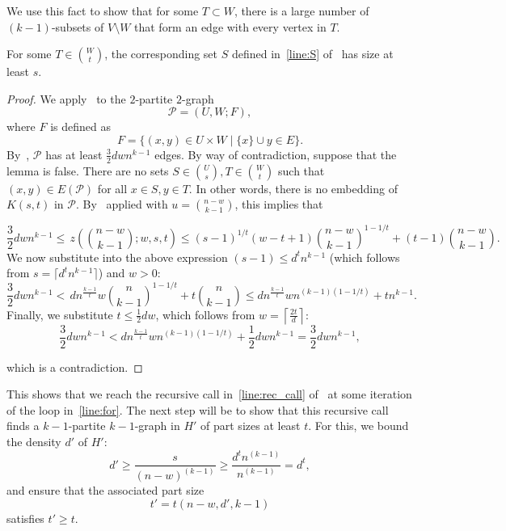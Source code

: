 We use this fact to show that for some $T \subset W$,
there is a large number of $(k-1)$-subsets of $V \setminus W$
that form an edge with every vertex in $T$.

\begin{lemma}\label{lm:return}
    For some $T \in \binom{W}{t}$, the corresponding set $S$ defined
    in~\cref{line:S} of~ has size at least $s$.
    \begin{proof}
        We apply~ to the $2$-partite $2$-graph
        \[
            \mathcal{P} = (U, W; F),
        \]
        where $F$ is defined as
        \[
            F = \{(x, y) \in U \times W \mid \{x\} \cup y \in E \}.
        \]
        By~, $\mathcal{P}$ has at least
        $\frac{3}{2}dwn^{k-1}$ edges.
        By way of contradiction, suppose that the lemma is false.
        There are no sets $S \in \binom{U}{s}, T \in \binom{W}{t}$
        such that $(x, y) \in E (\mathcal{P})$ for all $x \in S, y \in T $.
        In other words, there is no embedding of $K(s, t)$ in $\mathcal{P}$.
        By~ applied with $u = \binom{n-w}{k-1}$,
        this implies that

        \[
            \frac{3}{2}dwn^{k-1} \leq
            \, z \left(\binom{n - w}{k-1}; w, s, t  \right) \leq
            (s-1)^{1/t}(w-t+1)\binom{n-w}{k-1}^{1-1/t} + (t-1)\binom{n-w}{k-1}.
        \]
        We now substitute into the above expression $(s-1) \leq d^t n^{k-1}$ (which
        follows from $s = \lceil d^t n^{k-1} \rceil$) and $w > 0$:
        \[
             \frac{3}{2}dwn^{k-1} <
             \, dn^{\frac{k-1}{t}} w \binom{n}{k-1}^{1-1/t} + t \binom{n}{k-1} \leq
             dn^{\frac{k-1}{t}} wn^{(k-1)(1-1/t)} + tn^{k-1}.
        \]
        Finally, we substitute $t \leq \frac{1}{2}dw$, which follows from
        $w = \left\lceil \frac{2t}{d} \right\rceil$:
        \[
            \frac{3}{2}dwn^{k-1} <
            dn^{\frac{k-1}{t}} wn^{(k-1)(1-1/t)} + \frac{1}{2} dwn^{k-1} =
            \frac{3}{2} dwn^{k-1},
        \]

        which is a contradiction.
    \end{proof}
\end{lemma}

This shows that we reach the recursive call in~\cref{line:rec_call} of~
at some iteration of the loop in~\cref{line:for}.
The next step will be to show that this recursive call finds a $k-1$-partite $k-1$-graph in $H'$ of
part sizes at least $t$.
For this, we bound the density $d'$ of $H'$:
\[
    d' \geq \frac{s}{(n-w)^{(k-1)}} \geq \frac{d^t n^{(k-1)}}{n^{(k-1)}} = d^t,
\]
and ensure that the associated part size
\[
    t' = t(n - w, d', k - 1)
\]
satisfies $t' \geq t$.

